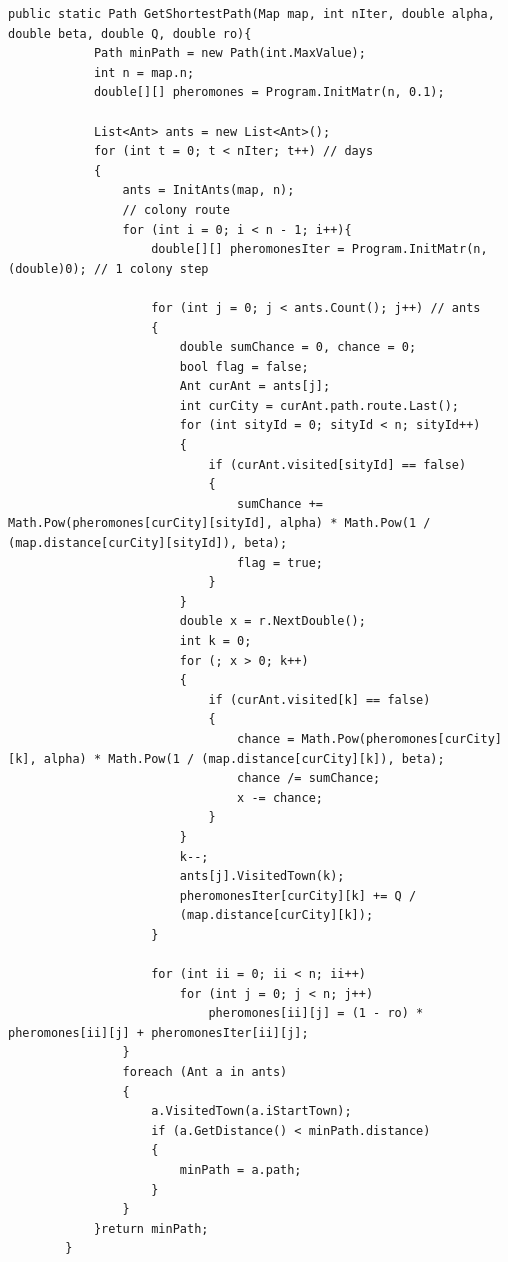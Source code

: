 \documentclass[12pt]{report}
\begin{document}
\begin{lstlisting}[label=some-code,caption=Муравьиный алгоритм]
public static Path GetShortestPath(Map map, int nIter, double alpha, double beta, double Q, double ro){
            Path minPath = new Path(int.MaxValue);
            int n = map.n;
            double[][] pheromones = Program.InitMatr(n, 0.1);

            List<Ant> ants = new List<Ant>();
            for (int t = 0; t < nIter; t++) // days
            {
                ants = InitAnts(map, n);
                // colony route
                for (int i = 0; i < n - 1; i++){
                    double[][] pheromonesIter = Program.InitMatr(n, (double)0); // 1 colony step

                    for (int j = 0; j < ants.Count(); j++) // ants
                    {
                        double sumChance = 0, chance = 0;
                        bool flag = false;
                        Ant curAnt = ants[j];
                        int curCity = curAnt.path.route.Last();
                        for (int sityId = 0; sityId < n; sityId++)
                        {
                            if (curAnt.visited[sityId] == false)
                            {
                                sumChance += Math.Pow(pheromones[curCity][sityId], alpha) * Math.Pow(1 / (map.distance[curCity][sityId]), beta);
                                flag = true;
                            }
                        }
                        double x = r.NextDouble();
                        int k = 0;
                        for (; x > 0; k++)
                        {
                            if (curAnt.visited[k] == false)
                            {
                                chance = Math.Pow(pheromones[curCity][k], alpha) * Math.Pow(1 / (map.distance[curCity][k]), beta);
                                chance /= sumChance;
                                x -= chance;
                            }
                        }
                        k--;
                        ants[j].VisitedTown(k);
                        pheromonesIter[curCity][k] += Q / 
                        (map.distance[curCity][k]);
                    }

                    for (int ii = 0; ii < n; ii++)
                        for (int j = 0; j < n; j++)
                            pheromones[ii][j] = (1 - ro) * pheromones[ii][j] + pheromonesIter[ii][j];
                }
                foreach (Ant a in ants)
                {
                    a.VisitedTown(a.iStartTown);
                    if (a.GetDistance() < minPath.distance)
                    {
                        minPath = a.path;
                    }
                }                
            }return minPath;
        }
\end{lstlisting}
\end{document}
